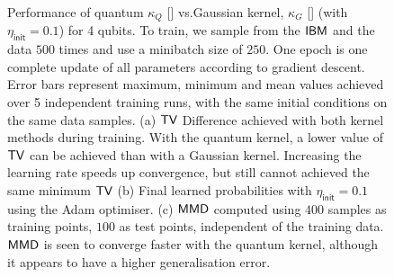 \begin{figure}[t!]
\begin{subfigure}[t]{0.31\textwidth}
        \caption{}
        \label{subfig:mmd_kernel_comp_4_qubits}
    \end{subfigure}
\caption{
Performance of quantum $\kappa_Q$ [\crule[red]{0.2cm}{0.2cm}] vs.\@ Gaussian kernel,  
$\kappa_G$ [\crule[blue]{0.2cm}{0.2cm}] (with $\eta_{\mathsf{init}} = 0.1$) for 4 qubits. 
To train, we sample from the $\textsf{IBM}$ and the data $500$ times and use a minibatch size of $250$. 
One epoch is one complete update of all parameters according to gradient descent. Error bars represent maximum, minimum and mean values achieved over 5 independent training runs, with the same initial conditions on the same data samples. (a) $\operatorname{\textsf{TV}}$ Difference achieved with both kernel methods during training. With the quantum kernel, a lower value of $\operatorname{\textsf{TV}}$ can be achieved than with a Gaussian kernel. Increasing the learning rate speeds up convergence, but still cannot achieved the same minimum $\operatorname{\textsf{TV}}$ (b) Final learned probabilities with $\eta_{\mathsf{init}} = 0.1$ using the Adam optimiser. (c) $\operatorname{\textsf{MMD}}$ computed using $400$ samples as training points, $100$ as test points, independent of the training data. $\operatorname{\textsf{MMD}}$ is seen to converge faster with the quantum kernel, although it appears to have a higher generalisation error.
\label{fig:QvGkernel4}
} 
\end{figure}

